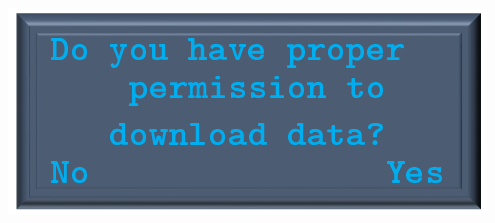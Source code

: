 \documentclass[11pt, oneside]{book}
\begin{document}
\hfill%
\begin{minipage}{0.45\textwidth}
\includegraphics[width=\linewidth]{../media/pstricks_files/12_proper_permission}
\end{minipage}
\\[\baselineskip]
\end{document}
